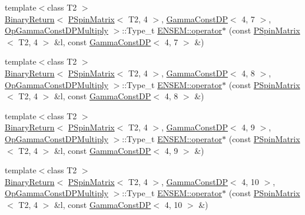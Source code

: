 \begin{DoxyCompactItemize}
\item 
{\footnotesize template$<$class T2 $>$ }\\\mbox{\hyperlink{structENSEM_1_1BinaryReturn}{Binary\+Return}}$<$ \mbox{\hyperlink{classENSEM_1_1PSpinMatrix}{P\+Spin\+Matrix}}$<$ T2, 4 $>$, \mbox{\hyperlink{classENSEM_1_1GammaConstDP}{Gamma\+Const\+DP}}$<$ 4, 7 $>$, \mbox{\hyperlink{structENSEM_1_1OpGammaConstDPMultiply}{Op\+Gamma\+Const\+D\+P\+Multiply}} $>$\+::Type\+\_\+t \mbox{\hyperlink{group__primspinmatrix_ga4540a205b423306c3a0d322e81d75d2d}{E\+N\+S\+E\+M\+::operator$\ast$}} (const \mbox{\hyperlink{classENSEM_1_1PSpinMatrix}{P\+Spin\+Matrix}}$<$ T2, 4 $>$ \&l, const \mbox{\hyperlink{classENSEM_1_1GammaConstDP}{Gamma\+Const\+DP}}$<$ 4, 7 $>$ \&)
\item 
{\footnotesize template$<$class T2 $>$ }\\\mbox{\hyperlink{structENSEM_1_1BinaryReturn}{Binary\+Return}}$<$ \mbox{\hyperlink{classENSEM_1_1PSpinMatrix}{P\+Spin\+Matrix}}$<$ T2, 4 $>$, \mbox{\hyperlink{classENSEM_1_1GammaConstDP}{Gamma\+Const\+DP}}$<$ 4, 8 $>$, \mbox{\hyperlink{structENSEM_1_1OpGammaConstDPMultiply}{Op\+Gamma\+Const\+D\+P\+Multiply}} $>$\+::Type\+\_\+t \mbox{\hyperlink{group__primspinmatrix_gaf745fe661bcdf107b27bf22e48d36d3e}{E\+N\+S\+E\+M\+::operator$\ast$}} (const \mbox{\hyperlink{classENSEM_1_1PSpinMatrix}{P\+Spin\+Matrix}}$<$ T2, 4 $>$ \&l, const \mbox{\hyperlink{classENSEM_1_1GammaConstDP}{Gamma\+Const\+DP}}$<$ 4, 8 $>$ \&)
\item 
{\footnotesize template$<$class T2 $>$ }\\\mbox{\hyperlink{structENSEM_1_1BinaryReturn}{Binary\+Return}}$<$ \mbox{\hyperlink{classENSEM_1_1PSpinMatrix}{P\+Spin\+Matrix}}$<$ T2, 4 $>$, \mbox{\hyperlink{classENSEM_1_1GammaConstDP}{Gamma\+Const\+DP}}$<$ 4, 9 $>$, \mbox{\hyperlink{structENSEM_1_1OpGammaConstDPMultiply}{Op\+Gamma\+Const\+D\+P\+Multiply}} $>$\+::Type\+\_\+t \mbox{\hyperlink{group__primspinmatrix_ga49c2bb9929a1c38be010fe8c661f3720}{E\+N\+S\+E\+M\+::operator$\ast$}} (const \mbox{\hyperlink{classENSEM_1_1PSpinMatrix}{P\+Spin\+Matrix}}$<$ T2, 4 $>$ \&l, const \mbox{\hyperlink{classENSEM_1_1GammaConstDP}{Gamma\+Const\+DP}}$<$ 4, 9 $>$ \&)
\item 
{\footnotesize template$<$class T2 $>$ }\\\mbox{\hyperlink{structENSEM_1_1BinaryReturn}{Binary\+Return}}$<$ \mbox{\hyperlink{classENSEM_1_1PSpinMatrix}{P\+Spin\+Matrix}}$<$ T2, 4 $>$, \mbox{\hyperlink{classENSEM_1_1GammaConstDP}{Gamma\+Const\+DP}}$<$ 4, 10 $>$, \mbox{\hyperlink{structENSEM_1_1OpGammaConstDPMultiply}{Op\+Gamma\+Const\+D\+P\+Multiply}} $>$\+::Type\+\_\+t \mbox{\hyperlink{group__primspinmatrix_gae0a36eebbac7cf857f48a6bd7966e139}{E\+N\+S\+E\+M\+::operator$\ast$}} (const \mbox{\hyperlink{classENSEM_1_1PSpinMatrix}{P\+Spin\+Matrix}}$<$ T2, 4 $>$ \&l, const \mbox{\hyperlink{classENSEM_1_1GammaConstDP}{Gamma\+Const\+DP}}$<$ 4, 10 $>$ \&)

\end{DoxyCompactItemize}
